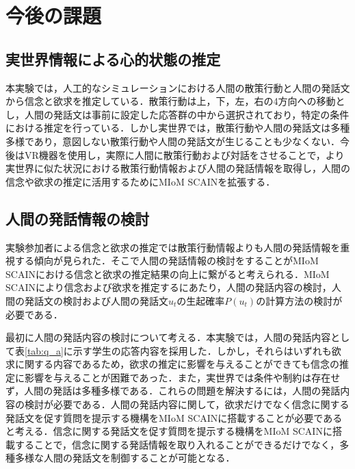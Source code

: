 \chapter{今後の課題}

\section{実世界情報による心的状態の推定}
本実験では，人工的なシミュレーションにおける人間の散策行動と人間の発話文から信念と欲求を推定している．散策行動は上，下，左，右の4方向への移動とし，人間の発話文は事前に設定した応答群の中から選択されており，特定の条件における推定を行っている．しかし実世界では，散策行動や人間の発話文は多種多様であり，意図しない散策行動や人間の発話文が生じることも少なくない．今後はVR機器を使用し，実際に人間に散策行動および対話をさせることで，より実世界に似た状況における散策行動情報および人間の発話情報を取得し，人間の信念や欲求の推定に活用するためにMIoM SCAINを拡張する．

\section{人間の発話情報の検討}

\par
実験参加者による信念と欲求の推定では散策行動情報よりも人間の発話情報を重視する傾向が見られた．そこで人間の発話情報の検討をすることがMIoM SCAINにおける信念と欲求の推定結果の向上に繋がると考えられる．MIoM SCAINにより信念および欲求を推定するにあたり，人間の発話内容の検討，人間の発話文の検討および人間の発話文$u_t$の生起確率$P(u_t)$の計算方法の検討が必要である．

\par
最初に人間の発話内容の検討について考える．本実験では，人間の発話内容として表\ref{tab:q_a}に示す学生の応答内容を採用した．しかし，それらはいずれも欲求に関する内容であるため，欲求の推定に影響を与えることができても信念の推定に影響を与えることが困難であった．また，実世界では条件や制約は存在せず，人間の発話は多種多様である．これらの問題を解決するには，人間の発話内容の検討が必要である．人間の発話内容に関して，欲求だけでなく信念に関する発話文を促す質問を提示する機構をMIoM SCAINに搭載することが必要であると考える．信念に関する発話文を促す質問を提示する機構をMIoM SCAINに搭載することで，信念に関する発話情報を取り入れることができるだけでなく，多種多様な人間の発話文を制御することが可能となる．

